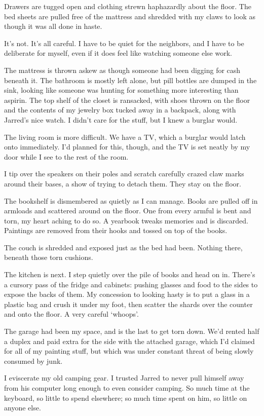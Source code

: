 Drawers are tugged open and clothing strewn haphazardly about the floor. The bed sheets are pulled free of the mattress and shredded with my claws to look as though it was all done in haste.

It's not. It's all careful. I have to be quiet for the neighbors, and I have to be deliberate for myself, even if it does feel like watching someone else work.

The mattress is thrown askew as though someone had been digging for cash beneath it. The bathroom is mostly left alone, but pill bottles are dumped in the sink, looking like someone was hunting for something more interesting than aspirin. The top shelf of the closet is ransacked, with shoes thrown on the floor and the contents of my jewelry box tucked away in a backpack, along with Jarred's nice watch. I didn't care for the stuff, but I knew a burglar would.

The living room is more difficult. We have a TV, which a burglar would latch onto immediately. I'd planned for this, though, and the TV is set neatly by my door while I see to the rest of the room.

I tip over the speakers on their poles and scratch carefully crazed claw marks around their bases, a show of trying to detach them. They stay on the floor.

The bookshelf is dismembered as quietly as I can manage. Books are pulled off in armloads and scattered around on the floor. One from every armful is bent and torn, my heart aching to do so. A yearbook tweaks memories and is discarded. Paintings are removed from their hooks and tossed on top of the books.

The couch is shredded and exposed just as the bed had been. Nothing there, beneath those torn cushions.

The kitchen is next. I step quietly over the pile of books and head on in. There's a cursory pass of the fridge and cabinets: pushing glasses and food to the sides to expose the backs of them. My concession to looking hasty is to put a glass in a plastic bag and crush it under my foot, then scatter the shards over the counter and onto the floor. A very careful `whoops'.

The garage had been my space, and is the last to get torn down. We'd rented half a duplex and paid extra for the side with the attached garage, which I'd claimed for all of my painting stuff, but which was under constant threat of being slowly consumed by junk.

I eviscerate my old camping gear. I trusted Jarred to never pull himself away from his computer long enough to even consider camping. So much time at the keyboard, so little to spend elsewhere; so much time spent on him, so little on anyone else.

